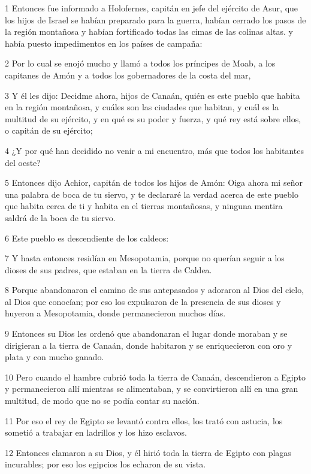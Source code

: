 \par 1 Entonces fue informado a Holofernes, capitán en jefe del ejército de Asur, que los hijos de Israel se habían preparado para la guerra, habían cerrado los pasos de la región montañosa y habían fortificado todas las cimas de las colinas altas. y había puesto impedimentos en los países de campaña:
\par 2 Por lo cual se enojó mucho y llamó a todos los príncipes de Moab, a los capitanes de Amón y a todos los gobernadores de la costa del mar,
\par 3 Y él les dijo: Decidme ahora, hijos de Canaán, quién es este pueblo que habita en la región montañosa, y cuáles son las ciudades que habitan, y cuál es la multitud de su ejército, y en qué es su poder y fuerza, y qué rey está sobre ellos, o capitán de su ejército;
\par 4 ¿Y por qué han decidido no venir a mi encuentro, más que todos los habitantes del oeste?
\par 5 Entonces dijo Achior, capitán de todos los hijos de Amón: Oiga ahora mi señor una palabra de boca de tu siervo, y te declararé la verdad acerca de este pueblo que habita cerca de ti y habita en el tierras montañosas, y ninguna mentira saldrá de la boca de tu siervo.
\par 6 Este pueblo es descendiente de los caldeos:
\par 7 Y hasta entonces residían en Mesopotamia, porque no querían seguir a los dioses de sus padres, que estaban en la tierra de Caldea.
\par 8 Porque abandonaron el camino de sus antepasados ​​y adoraron al Dios del cielo, al Dios que conocían; por eso los expulsaron de la presencia de sus dioses y huyeron a Mesopotamia, donde permanecieron muchos días.
\par 9 Entonces su Dios les ordenó que abandonaran el lugar donde moraban y se dirigieran a la tierra de Canaán, donde habitaron y se enriquecieron con oro y plata y con mucho ganado.
\par 10 Pero cuando el hambre cubrió toda la tierra de Canaán, descendieron a Egipto y permanecieron allí mientras se alimentaban, y se convirtieron allí en una gran multitud, de modo que no se podía contar su nación.
\par 11 Por eso el rey de Egipto se levantó contra ellos, los trató con astucia, los sometió a trabajar en ladrillos y los hizo esclavos.
\par 12 Entonces clamaron a su Dios, y él hirió toda la tierra de Egipto con plagas incurables; por eso los egipcios los echaron de su vista.
